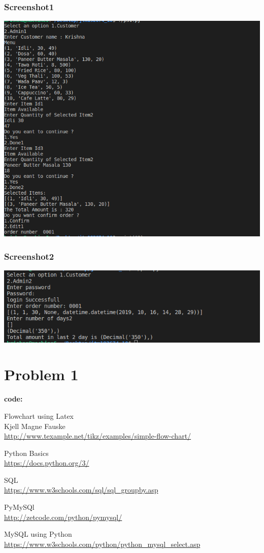 \documentclass[12pt]{article}
\begin{document}
\subsubsection{Screenshot1}
\includegraphics[width=\linewidth]{lab_10a.png}
\clearpage
\subsubsection{Screenshot2}
\includegraphics[width=\linewidth]{lab_10b.png}
\newpage
 \appendix
   \appendixpage
   \addappheadtotoc
  \section*{Problem 1}
  {\large \textbf{code:}}
  
  
\newpage
\begin{thebibliography}{11}
Flowchart using Latex\\
Kjell Magne Fauske \\
\url{http://www.texample.net/tikz/examples/simple-flow-chart/}

Python Basics \\
\url{https://docs.python.org/3/}

SQL\\
\url{https://www.w3schools.com/sql/sql_groupby.asp}

PyMySQl\\
\url{http://zetcode.com/python/pymysql/}

MySQL using Python\\
\url{https://www.w3schools.com/python/python_mysql_select.asp}

\end{thebibliography}

   
   
\end{document}
